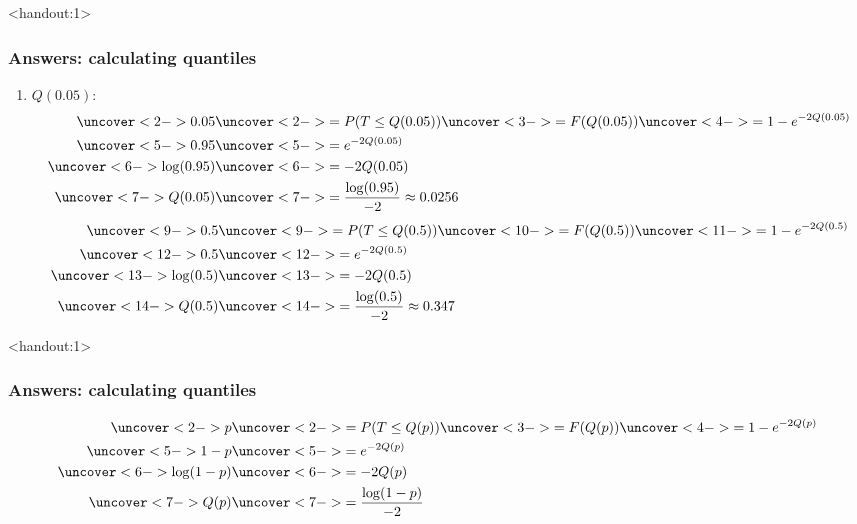 \documentclass[handout]{beamer}\usepackage[]{graphicx}\usepackage[]{color}
\newcommand{\answers}{1}
\numberwithin{equation}{section}
\begin{document}
\begin{frame}<handout:\answers>
\frametitle{Answers: calculating quantiles} \small
\begin{enumerate}[1. ]
\item $Q(0.05)$:
\begin{align*}
 \uncover<2->{0.05} &  \uncover<2->{= P(T \le Q(0.05))}  \uncover<3->{= F(Q(0.05))}  \uncover<4->{= 1 - e^{-2 Q(0.05)} } \\
 \uncover<5->{0.95} &  \uncover<5->{= e^{-2 Q(0.05)}} \\
 \uncover<6->{\log (0.95)} &  \uncover<6->{= -2 Q(0.05)} \\
 \uncover<7->{Q(0.05)} &  \uncover<7->{= \frac{\log(0.95)}{-2} \approx 0.0256}
\end{align*}
\begin{align*}
 \uncover<9->{0.5} &  \uncover<9->{= P(T \le Q(0.5))}  \uncover<10->{ = F(Q(0.5))}  \uncover<11->{= 1 - e^{-2 Q(0.5)}}  \\
 \uncover<12->{0.5} &  \uncover<12->{= e^{-2 Q(0.5)}} \\
 \uncover<13->{\log (0.5)} &  \uncover<13->{= -2 Q(0.5)} \\
 \uncover<14->{Q(0.5)} &  \uncover<14->{= \frac{\log(0.5)}{-2} \approx 0.347}
\end{align*}

\end{enumerate}
\end{frame}

\begin{frame}<handout:\answers>
\frametitle{Answers: calculating quantiles} \small
\begin{enumerate}[1. ]
\setcounter{enumi}{2}


\begin{align*}
 \uncover<2->{p} & \uncover<2->{= P(T \le Q(p))}  \uncover<3->{ = F(Q(p)) }  \uncover<4->{= 1 - e^{-2 Q(p)}}  \\
 \uncover<5->{1-p} &  \uncover<5->{= e^{-2 Q(p)}} \\
 \uncover<6->{\log (1-p) }&  \uncover<6->{= -2 Q(p)} \\
 \uncover<7->{Q(p)} &\uncover<7->{= \frac{\log (1-p)}{-2}}
\end{align*}

\end{enumerate}
\end{frame}
\end{document}
